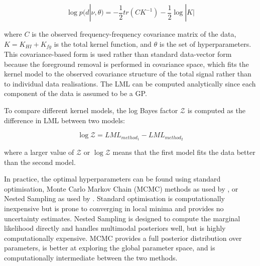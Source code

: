 

\begin{equation}
    \log p(d|\nu, \theta) = -\frac{1}{2} tr(CK^{-1}) - \frac{1}{2} \log|K|
\end{equation}

where $C$ is the observed frequency-frequency covariance matrix of the data, $K=K_{HI}+K_{fg}$ is the total kernel function, and $\theta$ is the set of hyperparameters. This covariance-based form is used rather than standard data-vector form because the foreground removal is performed in covariance space, which fits the kernel model to the observed covariance structure of the total signal rather than to individual data realisations. The LML can be computed analytically since each component of the data is assumed to be a GP.

To compare different kernel models, the log Bayes factor $\mathcal{Z}$ is computed as the difference in LML between two models: 

\begin{equation}
    \log \mathcal{Z} = LML_{method_1} - LML_{method_2}
\end{equation}

where a larger value of $\mathcal{Z}$ or $\log \mathcal{Z}$ means that the first model fits the data better than the second model.

In practice, the optimal hyperparameters can be found using standard optimisation, Monte Carlo Markov Chain (MCMC) methods as used by \cite{mertensImprovedUpperLimits2020}, or Nested Sampling as used by \cite{soaresGaussianProcessRegression2022}. Standard optimisation is computationally inexpensive but is prone to converging in local minima and provides no uncertainty estimates. Nested Sampling is designed to compute the marginal likelihood directly and handles multimodal posteriors well, but is highly computationally expensive. MCMC provides a full posterior distribution over parameters, is better at exploring the global parameter space, and is computationally intermediate between the two methods.

